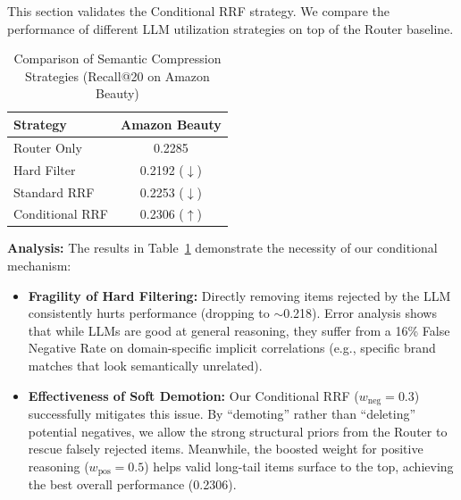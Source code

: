 This section validates the Conditional RRF strategy. We compare the performance of different LLM utilization strategies on top of the Router baseline.

\begin{table}[htbp]
\centering
\caption{Comparison of Semantic Compression Strategies (Recall@20 on Amazon Beauty)}
\label{tab:compression_ablation}
\begin{tabular}{lc}
\toprule
Strategy & Amazon Beauty \\
\midrule
Router Only & 0.2285 \\
Hard Filter & 0.2192 ($\downarrow$) \\
Standard RRF & 0.2253 ($\downarrow$) \\
Conditional RRF & 0.2306 ($\uparrow$) \\
\bottomrule
\end{tabular}
\end{table}

\textbf{Analysis:}
The results in Table~\ref{tab:compression_ablation} demonstrate the necessity of our conditional mechanism:

\begin{itemize}
    \item \textbf{Fragility of Hard Filtering:} Directly removing items rejected by the LLM consistently hurts performance (dropping to $\sim$0.218). Error analysis shows that while LLMs are good at general reasoning, they suffer from a 16\% False Negative Rate on domain-specific implicit correlations (e.g., specific brand matches that look semantically unrelated).
    \item \textbf{Effectiveness of Soft Demotion:} Our Conditional RRF ($w_{\mathrm{neg}}=0.3$) successfully mitigates this issue. By ``demoting'' rather than ``deleting'' potential negatives, we allow the strong structural priors from the Router to rescue falsely rejected items. Meanwhile, the boosted weight for positive reasoning ($w_{\mathrm{pos}}=0.5$) helps valid long-tail items surface to the top, achieving the best overall performance (0.2306).
\end{itemize}